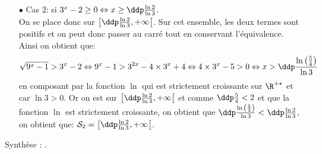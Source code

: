 \begin{correction}
\begin{enumerate}
\begin{itemize}
\begin{itemize}
\item[$\bullet$] Cas 2: si $3^x-2\geq  0\Leftrightarrow x\geq \ddp\frac{\ln{2}}{\ln{3}} $.\\
\noindent On se place donc sur $\left\lbrack \ddp\frac{\ln{2}}{\ln{3}},+\infty \right\lbrack$. Sur cet ensemble, les deux termes sont positifs et on peut donc passer au carr\'e tout en conservant l'\'equivalence. Ainsi on obtient que:
$$\sqrt{9^x-1}>3^x-2 \Leftrightarrow 9^x-1>3^{2x}-4\times 3^x+4\Leftrightarrow 4\times 3^x-5>0\Leftrightarrow x>\ddp\frac{\ln{\left( \frac{5}{4} \right)}}{\ln{3}}$$
en composant par la fonction $\ln{}$ qui est strictement croissante sur $\R^{+\star}$ et car $\ln{3}>0$. Or on est sur 
$\left\lbrack \ddp\frac{\ln{2}}{\ln{3}},+\infty \right\lbrack$ et comme $\ddp\frac{5}{4}<2$ et que la fonction $\ln{}$ est strictement croissante, on obtient que $\ddp\frac{  \ln{\left( \frac{5}{4} \right)}  }{\ln{3}}<\ddp\frac{\ln{2}}{\ln{3}}$, on obtient que: $\mathcal{S}_2=\left\lbrack \ddp\frac{\ln{2}}{\ln{3}},+\infty \right\lbrack$.
\end{itemize}
Synth\`ese : .
\end{itemize}
\end{enumerate}
\end{correction}